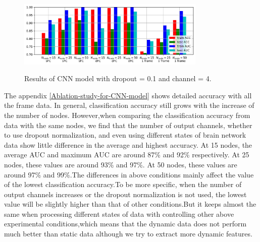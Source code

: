 \documentclass[11pt]{article}
\begin{document}
\begin{figure}[H]
    \centering
    \includegraphics[width=0.8\textwidth]{../Result/bar_channel=4_dropout=0.1.jpg} \\
    \caption{Results of CNN model with dropout = 0.1 and channel = 4.}
    \label{CNN-results}
\end{figure}

The appendix \ref{Ablation-study-for-CNN-model} shows detailed accuracy with all the frame data. In general, classification accuracy still grows with the increase of the number of nodes. However,when comparing the classification accuracy from data with the same nodes, we find that the number of output channels, whether to use dropout normalization, and even using different states of brain network data show little difference in the average and highest accuracy. At 15 nodes, the average AUC and maximum AUC are around 87\% and 92\% respectively. At 25 nodes, these values are around 93\% and 97\%. At 50 nodes, these values are around 97\% and 99\%.The differences in above conditions mainly affect the value of the lowest classification accuracy.To be more specific, when the number of output channels increases or the dropout normalization is not used, the lowest value will be slightly higher than that of other conditions.But it keeps almost the same when processing different states of data with controlling other above experimental conditions,which means that the dynamic data does not perform much better than static data although we try to extract more dynamic features.
\end{document}
